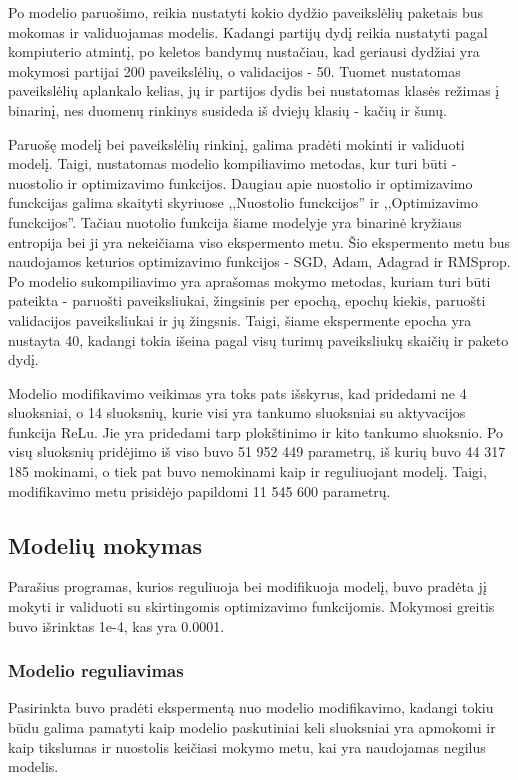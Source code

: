 \documentclass{VUMIFPSkursinis}
\begin{document}
Po modelio paruošimo, reikia nustatyti kokio dydžio paveikslėlių paketais bus mokomas ir validuojamas modelis. Kadangi partijų dydį reikia nustatyti pagal kompiuterio atmintį, 
po keletos bandymų nustačiau, kad geriausi dydžiai yra mokymosi partijai 200 paveikslėlių, o validacijos - 50.
Tuomet nustatomas paveikslėlių aplankalo kelias, jų ir partijos dydis bei nustatomas klasės režimas į binarinį, nes duomenų rinkinys susideda iš dviejų klasių - kačių ir šunų.

Paruošę modelį bei paveikslėlių rinkinį, galima pradėti mokinti ir validuoti modelį. Taigi, nustatomas modelio kompiliavimo metodas, kur turi būti - nuostolio ir 
optimizavimo funkcijos. Daugiau apie nuostolio ir optimizavimo funckcijas galima skaityti skyriuose ,,Nuostolio funckcijos'' ir ,,Optimizavimo funckcijos''. Tačiau nuotolio 
funkcija šiame modelyje yra binarinė kryžiaus entropija bei ji yra nekeičiama viso ekspermento metu. Šio ekspermento metu bus naudojamos keturios optimizavimo funkcijos - SGD, 
Adam, Adagrad ir RMSprop. Po modelio sukompiliavimo yra aprašomas mokymo metodas, kuriam turi būti pateikta - paruošti paveiksliukai, žingsinis per epochą, epochų kiekis, 
paruošti validacijos paveiksliukai ir jų žingsnis. Taigi, šiame ekspermente epocha yra nustayta 40, kadangi tokia išeina pagal visų turimų paveiksliukų skaičių ir paketo dydį.

Modelio modifikavimo veikimas yra toks pats išskyrus, kad pridedami ne 4 sluoksniai, o 14 sluoksnių, kurie visi yra tankumo sluoksniai su aktyvacijos funkcija ReLu. Jie yra 
pridedami tarp plokštinimo ir kito tankumo sluoksnio. Po visų sluoksnių pridėjimo iš viso buvo 51 952 449 parametrų, iš kurių buvo 44 317 185 mokinami, o tiek pat buvo nemokinami 
kaip ir reguliuojant modelį. Taigi, modifikavimo metu prisidėjo papildomi 11 545 600 parametrų.

\subsection{Modelių mokymas}
Parašius programas, kurios reguliuoja bei modifikuoja modelį, buvo pradėta jį mokyti ir validuoti su skirtingomis optimizavimo funkcijomis.
Mokymosi greitis buvo išrinktas 1e-4, kas yra 0.0001.
\subsubsection{Modelio reguliavimas}
Pasirinkta buvo pradėti ekspermentą nuo modelio modifikavimo, kadangi tokiu būdu galima pamatyti kaip modelio paskutiniai keli sluoksniai yra apmokomi ir kaip tikslumas ir nuostolis 
keičiasi mokymo metu, kai yra naudojamas negilus modelis.
\end{document}
